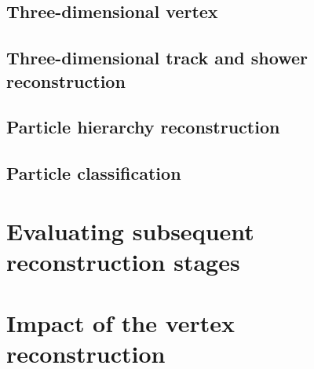 \subsection{Three-dimensional vertex}



\subsection{Three-dimensional track and shower reconstruction}



\subsection{Particle hierarchy reconstruction}



\subsection{Particle classification}



\section{Evaluating subsequent reconstruction stages}



\section{Impact of the vertex reconstruction}

